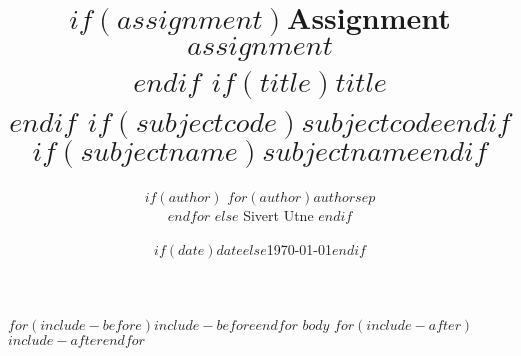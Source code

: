 \documentclass[]{$documentclass$}
\title{
    $if(assignment)${\color{Gray}\large Assignment $assignment$\\\vspace{-1mm}}$endif$
    $if(title)$\textbf{$title$}\\\vspace{-1mm}$endif$
    {\color{Gray}\normalsize $if(subjectcode)$$subjectcode$$endif$ $if(subjectname)$$subjectname$$endif$}
}
\author{
$if(author)$
    $for(author)$$author$$sep$ \\ $endfor$
$else$
    Sivert Utne
$endif$
}
\date{$if(date)$$date$$else$\today$endif$}
\begin{document}
    \maketitle

    \vfill
    \tableofcontents 
    \thispagestyle{empty}

    $for(include-before)$$include-before$$endfor$
    \clearpage
    \renewcommand{\arraystretch}{1.3}
    \setcounter{page}{1}
    $body$ %
    $for(include-after)$$include-after$$endfor$
\end{document}
